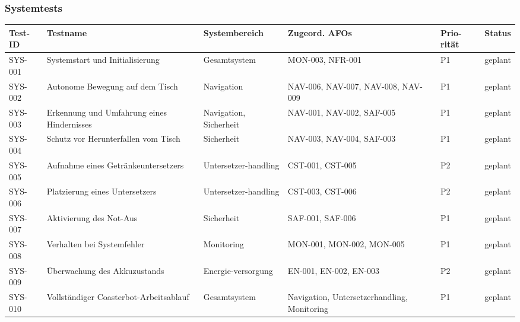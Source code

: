 \subsubsection{Systemtests}\label{systemtests-2}

\begin{longtable}[]{@{}
  >{\raggedright\arraybackslash}p{}
  >{\raggedright\arraybackslash}p{}
  >{\raggedright\arraybackslash}p{}
  >{\raggedright\arraybackslash}p{}
  >{\raggedright\arraybackslash}p{}
  >{\raggedright\arraybackslash}p{}@{}}
\toprule\noalign{}
\begin{minipage}[b]{\linewidth}\raggedright
Test-ID
\end{minipage} & \begin{minipage}[b]{\linewidth}\raggedright
Testname
\end{minipage} & \begin{minipage}[b]{\linewidth}\raggedright
Systembereich
\end{minipage} & \begin{minipage}[b]{\linewidth}\raggedright
Zugeord. AFOs
\end{minipage} & \begin{minipage}[b]{\linewidth}\raggedright
Prio-rität
\end{minipage} & \begin{minipage}[b]{\linewidth}\raggedright
Status
\end{minipage} \\
\midrule\noalign{}
\endhead
\bottomrule\noalign{}
\endlastfoot
SYS-001 & Systemstart und Initialisierung & Gesamtsystem & MON-003,
NFR-001 & P1 & geplant \\
SYS-002 & Autonome Bewegung auf dem Tisch & Navigation & NAV-006,
NAV-007, NAV-008, NAV-009 & P1 & geplant \\
SYS-003 & Erkennung und Umfahrung eines Hindernisses & Navigation,
Sicherheit & NAV-001, NAV-002, SAF-005 & P1 & geplant \\
SYS-004 & Schutz vor Herunterfallen vom Tisch & Sicherheit & NAV-003,
NAV-004, SAF-003 & P1 & geplant \\
SYS-005 & Aufnahme eines Getränkeuntersetzers & Untersetzer-handling &
CST-001, CST-005 & P2 & geplant \\
SYS-006 & Platzierung eines Untersetzers & Untersetzer-handling &
CST-003, CST-006 & P2 & geplant \\
SYS-007 & Aktivierung des Not-Aus & Sicherheit & SAF-001, SAF-006 & P1 &
geplant \\
SYS-008 & Verhalten bei Systemfehler & Monitoring & MON-001, MON-002,
MON-005 & P1 & geplant \\
SYS-009 & Überwachung des Akkuzustands & Energie-versorgung & EN-001,
EN-002, EN-003 & P2 & geplant \\
SYS-010 & Vollständiger Coasterbot-Arbeitsablauf & Gesamtsystem &
Navigation, Untersetzerhandling, Monitoring & P1 & geplant \\
\end{longtable}


